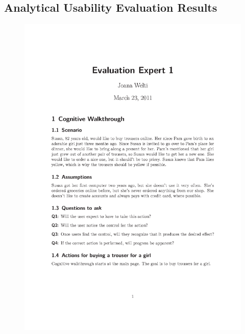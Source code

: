 \subsection{Analytical Usability Evaluation Results}
\begin{figure}[h!]
\begin{center}
\includegraphics[scale=0.77]{Analytical_Usability_Evaluation/cognitive_walkthrough_joana_1.png}
\end{center}
\end{figure}
\newpage


